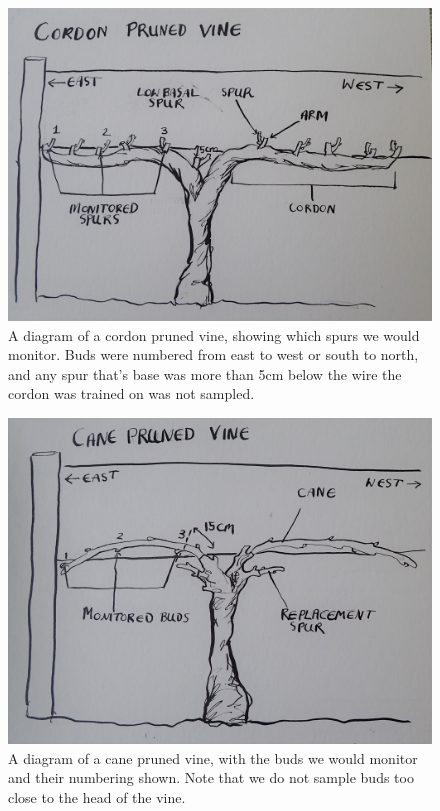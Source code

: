 \documentclass[11pt,letter]{article}
\begin{document}
\begin{figure}%
  \includegraphics[width=\linewidth]{CordonPruned.jpg}
  \caption{A diagram of a cordon pruned vine, showing which spurs we would monitor. Buds were numbered from east to west or south to north, and any spur that's base was more than 5cm below the wire the cordon was trained on was not sampled.}
  \label{fig:CordonPruned}
\end{figure}

\begin{figure}%
  \includegraphics[width=\linewidth]{CanePruned.jpg}
  \caption{A diagram of a cane pruned vine, with the buds we would monitor and their numbering shown. Note that we do not sample buds too close to the head of the vine.}
  \label{fig:CanePruned}
\end{figure}
\end{document}
